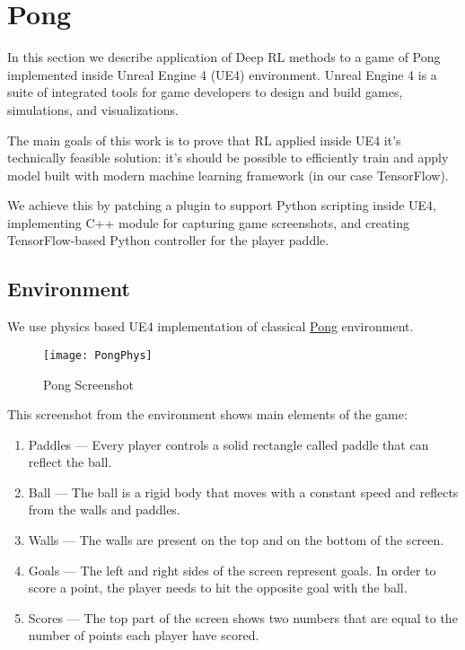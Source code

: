 \section{Pong}

In this section we describe application of Deep RL methods to a game of Pong implemented inside Unreal Engine 4 (UE4) environment.
Unreal Engine 4 is a suite of integrated tools for game developers to design and build games, simulations, and visualizations.

The main goals of this work is to prove that RL applied inside UE4 it's technically feasible solution: it's should be possible to efficiently train and apply model built with modern machine learning framework (in our case TensorFlow).

We achieve this by patching a plugin to support Python scripting inside UE4, implementing C++ module for capturing game screenshots, and creating TensorFlow-based Python controller for the player paddle.

\subsection{Environment}

We use physics based UE4 implementation of classical \href{https://en.wikipedia.org/wiki/Pong}{Pong} environment. 
\begin{figure}[h!]
\caption{Pong Screenshot}
\texttt{[image: PongPhys]}
\end{figure}

This screenshot from the environment shows main elements of the game:
\begin{enumerate}
    \item Paddles ---
        Every player controls a solid rectangle called paddle that can reflect the ball.
    \item Ball ---
        The ball is a rigid body that moves with a constant speed and reflects from the walls and paddles.
    \item Walls ---
        The walls are present on the top and on the bottom of the screen.
    \item Goals ---
        The left and right sides of the screen represent goals. In order to score a point, the player needs to hit the opposite goal with the ball.
    \item Scores ---
        The top part of the screen shows two numbers that are equal to the number of points each player have scored.
\end{enumerate}

